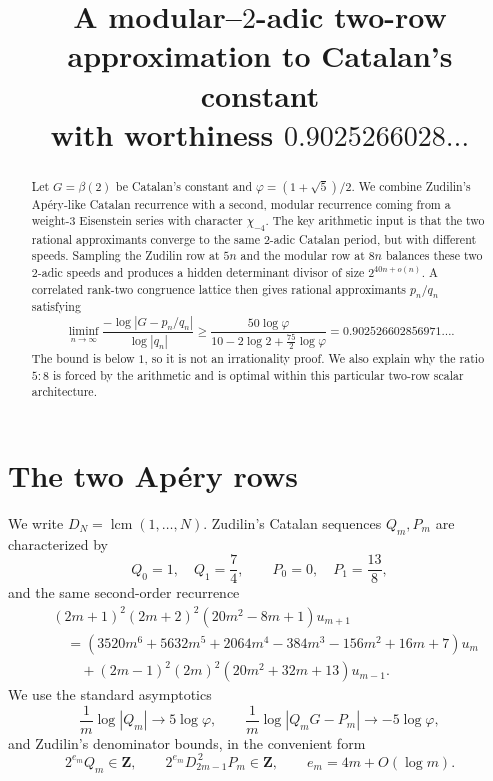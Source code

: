 \documentclass[11pt]{article}
\title{A modular--$2$-adic two-row approximation to Catalan's constant\\
with worthiness $0.9025266028\ldots$}
\author{}
\date{}
\newcommand{\Z}{\mathbf Z}
\newcommand{\phiG}{\varphi}
\begin{document}
\maketitle

\begin{abstract}
Let $G=\beta(2)$ be Catalan's constant and $\phiG=(1+\sqrt5)/2$.  We combine
Zudilin's Ap\'ery-like Catalan recurrence with a second, modular recurrence
coming from a weight-$3$ Eisenstein series with character $\chi_{-4}$.  The
key arithmetic input is that the two rational approximants converge to the
same $2$-adic Catalan period, but with different speeds.  Sampling the
Zudilin row at $5n$ and the modular row at $8n$ balances these two $2$-adic
speeds and produces a hidden determinant divisor of size $2^{40n+o(n)}$.
A correlated rank-two congruence lattice then gives rational approximants
$p_n/q_n$ satisfying
\[
 \liminf_{n\to\infty}
 \frac{-\log|G-p_n/q_n|}{\log|q_n|}
 \ge
 \frac{50\log\phiG}
 {10-2\log2+\frac{75}{2}\log\phiG}
 =0.902526602856971\ldots .
\]
The bound is below $1$, so it is not an irrationality proof.  We also explain
why the ratio $5:8$ is forced by the arithmetic and is optimal within this
particular two-row scalar architecture.
\end{abstract}

\section{The two Ap\'ery rows}

We write $D_N=\operatorname{lcm}(1,\dots,N)$.  Zudilin's Catalan sequences
$Q_m,P_m$ are characterized by
\[
 Q_0=1,\quad Q_1=\frac74,\qquad
 P_0=0,\quad P_1=\frac{13}{8},
\]
and the same second-order recurrence
\begin{align*}
 &(2m+1)^2(2m+2)^2(20m^2-8m+1)u_{m+1}\\
 &\quad=
 (3520m^6+5632m^5+2064m^4-384m^3-156m^2+16m+7)u_m\\
 &\qquad +(2m-1)^2(2m)^2(20m^2+32m+13)u_{m-1}.
\end{align*}
We use the standard asymptotics
\begin{equation}\label{eq:Zarch}
 \frac1m\log|Q_m|\to5\log\phiG,
 \qquad
 \frac1m\log|Q_mG-P_m|\to-5\log\phiG,
\end{equation}
and Zudilin's denominator bounds, in the convenient form
\begin{equation}\label{eq:Zden}
 2^{e_m}Q_m\in\Z,
 \qquad
 2^{e_m}D_{2m-1}^{\,2}P_m\in\Z,
 \qquad
 e_m=4m+O(\log m).
\end{equation}
\end{document}
